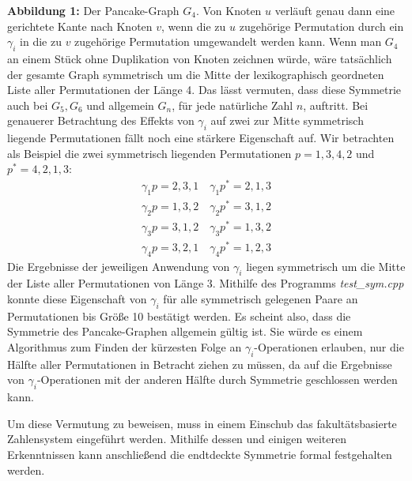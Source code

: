 \documentclass[a4paper, 11pt, ngerman]{article}
\begin{document}
\newline \newline
\textbf{Abbildung 1:} Der Pancake-Graph $G_4$. Von Knoten $u$ verläuft genau dann eine gerichtete Kante nach Knoten $v$, wenn die zu $u$ zugehörige Permutation durch ein $\gamma_i$ in die zu $v$ zugehörige Permutation umgewandelt werden kann.
\newpage
Wenn man $G_4$ an einem Stück ohne Duplikation von Knoten zeichnen würde, wäre tatsächlich der gesamte Graph symmetrisch um die Mitte der lexikographisch geordneten Liste aller Permutationen der Länge 4. Das lässt vermuten, dass diese Symmetrie auch bei $G_5, G_6$ und allgemein $G_n$, für jede natürliche Zahl $n$, auftritt.
Bei genauerer Betrachtung des Effekts von $\gamma_i$ auf zwei zur Mitte symmetrisch liegende Permutationen fällt noch eine stärkere Eigenschaft auf. Wir betrachten als Beispiel die zwei symmetrisch liegenden Permutationen $p = 1,3,4,2$ und $p^* = 4, 2, 1, 3$:
\begin{align*}
    \gamma_1 p = 2, 3, 1 \quad \gamma_1 p^* = 2, 1, 3 \\
    \gamma_2 p = 1, 3, 2 \quad \gamma_2 p^* = 3, 1, 2 \\
    \gamma_3 p = 3, 1, 2 \quad \gamma_3 p^* = 1, 3, 2 \\
    \gamma_4 p = 3, 2, 1 \quad \gamma_4 p^* = 1, 2, 3
\end{align*}
Die Ergebnisse der jeweiligen Anwendung von $\gamma_i$ liegen symmetrisch um die Mitte der Liste aller Permutationen von Länge 3. Mithilfe des Programms \emph{test\_sym.cpp} konnte diese Eigenschaft von $\gamma_i$ für alle symmetrisch gelegenen Paare an Permutationen bis Größe 10 bestätigt werden. Es scheint also, dass die Symmetrie des Pancake-Graphen allgemein gültig ist. Sie würde es einem Algorithmus zum Finden der kürzesten Folge an $\gamma_i$-Operationen erlauben, nur die Hälfte aller Permutationen in Betracht ziehen zu müssen, da auf die Ergebnisse von $\gamma_i$-Operationen mit der anderen Hälfte durch Symmetrie geschlossen werden kann.

Um diese Vermutung zu beweisen, muss in einem Einschub das fakultätsbasierte Zahlensystem eingeführt werden. Mithilfe dessen und einigen weiteren Erkenntnissen kann anschließend die endtdeckte Symmetrie formal festgehalten werden.
\end{document}
